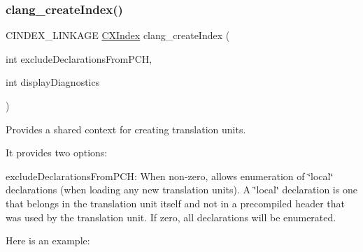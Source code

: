 \subsubsection{\texorpdfstring{clang\+\_\+create\+Index()}{clang\_createIndex()}}
{\footnotesize\ttfamily C\+I\+N\+D\+E\+X\+\_\+\+L\+I\+N\+K\+A\+GE \hyperlink{group__CINDEX_gae039c2574bfd75774ca7a9a3e55910cb}{C\+X\+Index} clang\+\_\+create\+Index (\begin{DoxyParamCaption}\item[{int}]{exclude\+Declarations\+From\+P\+CH,  }\item[{int}]{display\+Diagnostics }\end{DoxyParamCaption})}



Provides a shared context for creating translation units. 

It provides two options\+:


\begin{DoxyItemize}
\item exclude\+Declarations\+From\+P\+CH\+: When non-\/zero, allows enumeration of \char`\"{}local\char`\"{} declarations (when loading any new translation units). A \char`\"{}local\char`\"{} declaration is one that belongs in the translation unit itself and not in a precompiled header that was used by the translation unit. If zero, all declarations will be enumerated.
\end{DoxyItemize}

Here is an example\+:


